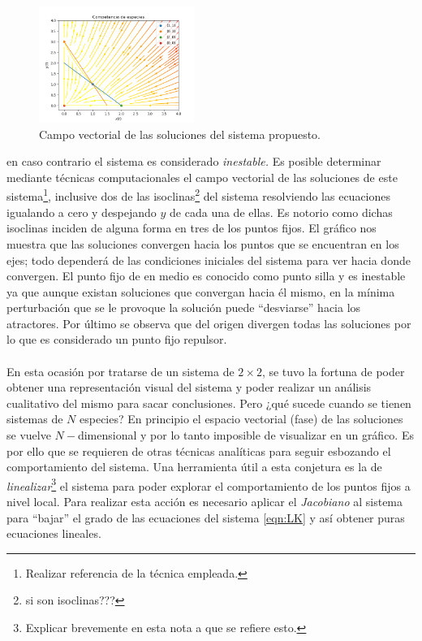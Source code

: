 \documentclass[11pt,a4paper]{article}
\begin{document}
\begin{figure} \vspace{-30pt} \begin{center}
		\includegraphics[width=0.45\textwidth]{Competencia de especies} 
		\end{center} 
		\vspace{-20pt} 
		\caption{Campo vectorial de las soluciones del sistema propuesto.} 
		\vspace{-10pt}
		\label{fig:CompetenciaEspecies}
\end{figure} 
en caso contrario el sistema es considerado \textit{inestable.} Es posible determinar mediante técnicas computacionales el campo vectorial de las soluciones de este sistema\footnote{Realizar referencia de la técnica empleada.}, inclusive dos de las isoclinas\footnote{si son isoclinas???} del sistema resolviendo las ecuaciones igualando a cero y despejando $y$ de cada una de ellas. Es notorio como dichas isoclinas inciden de alguna forma en tres de los puntos fijos. El gráfico nos muestra que las soluciones convergen hacia los puntos que se encuentran en los ejes; todo dependerá de las condiciones iniciales del sistema para ver hacia donde convergen. El punto fijo de en medio es conocido como punto silla y es inestable ya que aunque existan soluciones que convergan hacia él mismo, en la mínima perturbación que se le provoque la solución puede ``desviarse'' hacia los atractores. Por último se observa que del origen divergen todas las soluciones por lo que es considerado un punto fijo repulsor.\\
\\
En esta ocasión por tratarse de un sistema de $2\times 2$, se tuvo la fortuna de poder obtener una representación visual del sistema y poder realizar un análisis cualitativo del mismo para sacar conclusiones. Pero ¿qué sucede cuando se tienen sistemas de $N$ especies? En principio el espacio vectorial (fase) de las soluciones se vuelve $N-$dimensional y por lo tanto imposible de visualizar en un gráfico. Es por ello que se requieren de otras técnicas analíticas para seguir esbozando el comportamiento del sistema. Una herramienta útil a esta conjetura es la de \textit{linealizar}\footnote{Explicar brevemente en esta nota a que se refiere esto.} el sistema para poder explorar el comportamiento de los puntos fijos a nivel local. Para realizar esta acción es necesario aplicar el \textit{Jacobiano} al sistema para ``bajar'' el grado de las ecuaciones del sistema \ref{eqn:LK} y así obtener puras ecuaciones lineales.\\
\end{document}
